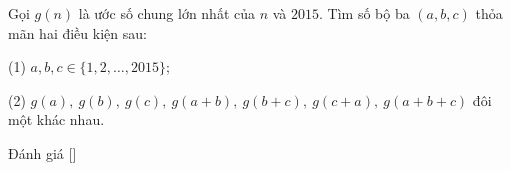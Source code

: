 \ifshowproblem
\begin{problem}\label{problem:CHN-2015-GMO-P4}
    Gọi $g(n)$ là ước số chung lớn nhất của $n$ và $2015$. Tìm số bộ ba $(a,b,c)$ thỏa mãn hai điều kiện sau:

    (1) $a,b,c \in \{1,2,\ldots,2015\};$

    (2) $g(a),\ g(b),\ g(c),\ g(a+b),\ g(b+c),\ g(c+a),\ g(a+b+c)$ đôi một khác nhau.
\end{problem}
\fi

\ifshowinfo
Đánh giá [\textbf{}]\footnotemark
{}
\fi